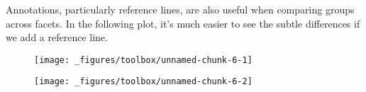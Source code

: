 Annotations, particularly reference lines, are also useful when
comparing groups across facets. In the following plot, it's much easier
to see the subtle differences if we add a reference line.

\begin{Shaded}
\begin{Highlighting}[]
\NormalTok{(}\StringTok{ }
\StringTok{  }\NormalTok{() +}\StringTok{ }
\StringTok{  } \NormalTok{)}
\end{Highlighting}
\end{Shaded}

\begin{figure}[H]
  \texttt{[image: \_figures/toolbox/unnamed-chunk-6-1]}%
\end{figure}

\begin{Shaded}
\begin{Highlighting}[]

\StringTok{ }\NormalTok{(}\NormalTok{(}\StringTok{ } 
\NormalTok{(}\StringTok{ }
\StringTok{  }\NormalTok{() +}\StringTok{ }
\StringTok{  }\NormalTok{(} \NormalTok{mod_coef[}\NormalTok{], } \NormalTok{mod_coef[}\NormalTok{], }
     \NormalTok{, } \NormalTok{) +}\StringTok{ }
\StringTok{  } \NormalTok{)}
\end{Highlighting}
\end{Shaded}

\begin{figure}[H]
  \texttt{[image: \_figures/toolbox/unnamed-chunk-6-2]}
\end{figure}


